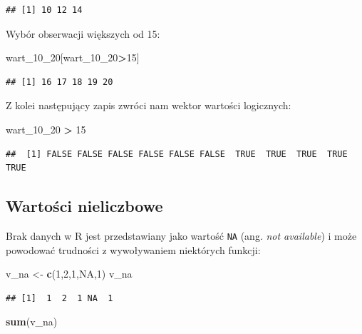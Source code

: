 \documentclass[]{book}
\newenvironment{Shaded}{\begin{snugshade}}{\end{snugshade}}
\newcommand{\KeywordTok}[1]{\textcolor[rgb]{0.13,0.29,0.53}{\textbf{#1}}}
\newcommand{\DecValTok}[1]{\textcolor[rgb]{0.00,0.00,0.81}{#1}}
\newcommand{\StringTok}[1]{\textcolor[rgb]{0.31,0.60,0.02}{#1}}
\newcommand{\OtherTok}[1]{\textcolor[rgb]{0.56,0.35,0.01}{#1}}
\newcommand{\OperatorTok}[1]{\textcolor[rgb]{0.81,0.36,0.00}{\textbf{#1}}}
\newcommand{\NormalTok}[1]{#1}
\begin{document}
\begin{verbatim}
## [1] 10 12 14
\end{verbatim}

Wybór obserwacji większych od 15:

\begin{Shaded}
\begin{Highlighting}[]
\NormalTok{wart_10_}\DecValTok{20}\NormalTok{[wart_10_}\DecValTok{20}\OperatorTok{>}\DecValTok{15}\NormalTok{]}
\end{Highlighting}
\end{Shaded}

\begin{verbatim}
## [1] 16 17 18 19 20
\end{verbatim}

Z kolei następujący zapis zwróci nam wektor wartości logicznych:

\begin{Shaded}
\begin{Highlighting}[]
\NormalTok{wart_10_}\DecValTok{20} \OperatorTok{>}\StringTok{ }\DecValTok{15}
\end{Highlighting}
\end{Shaded}

\begin{verbatim}
##  [1] FALSE FALSE FALSE FALSE FALSE FALSE  TRUE  TRUE  TRUE  TRUE  TRUE
\end{verbatim}

\subsection{Wartości nieliczbowe}\label{wartosci-nieliczbowe}

Brak danych w R jest przedstawiany jako wartość \texttt{NA} (ang.
\emph{not available}) i może powodować trudności z wywoływaniem
niektórych funkcji:

\begin{Shaded}
\begin{Highlighting}[]
\NormalTok{v_na <-}\StringTok{ }\KeywordTok{c}\NormalTok{(}\DecValTok{1}\NormalTok{,}\DecValTok{2}\NormalTok{,}\DecValTok{1}\NormalTok{,}\OtherTok{NA}\NormalTok{,}\DecValTok{1}\NormalTok{)}
\NormalTok{v_na}
\end{Highlighting}
\end{Shaded}

\begin{verbatim}
## [1]  1  2  1 NA  1
\end{verbatim}

\begin{Shaded}
\begin{Highlighting}[]
\KeywordTok{sum}\NormalTok{(v_na)}
\end{Highlighting}
\end{Shaded}
\end{document}
